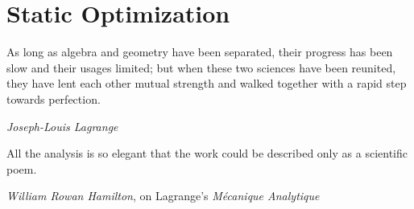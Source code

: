 \chapter{Static Optimization}
\label{ch:canonical-problems}

\epigraph{As long as algebra and geometry have been separated, their progress has been slow and their usages limited; but when these two sciences have been reunited, they have lent each other mutual strength and walked together with a rapid step towards perfection.}{\textit{Joseph-Louis Lagrange}}

\epigraph{All the analysis is so elegant that the work could be described only as a scientific poem.}{\textit{William Rowan Hamilton}, on Lagrange's \textit{Mécanique Analytique}}







